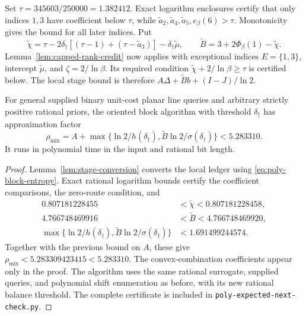 Set $\tau=345603/250000=1.382412$. Exact logarithm enclosures certify
that only indices $1,3$ have coefficient below $\tau$, while
$\widetilde a_2,\widetilde a_4,\widetilde a_5,e_\beta(6)>\tau$.
Monotonicity gives the bound for all later indices.
Put
\[
 \widetilde\chi=\tau-2\delta_\dagger
                [(\tau-1)+(\tau-\widetilde a_3)]
                -\delta_\dagger\widetilde\mu,\qquad
 \widetilde B=3+2\Phi_\beta(1)-\widetilde\chi.
\]
Lemma~\ref{lem:capped-rank-credit} now applies with exceptional
indices $E=\{1,3\}$, intercept $\widetilde\mu$, and
$\zeta=2/\ln\beta$. Its required condition
$\widetilde\chi+2/\ln\beta\ge\tau$ is certified below. The local
stage bound is therefore
$A\Delta+\widetilde B b+(I-J)/\ln2$.

\begin{theorem}
\label{thm:poly-mixed-expected}
For general supplied binary unit-cost planar line queries and arbitrary
strictly positive rational priors, the oriented block algorithm with
threshold $\delta_\dagger$ has approximation factor
\[
 \boxed{\rho_{\mathrm{mix}}=
 A+\max\{\ln2/h(\delta_\dagger),
         \widetilde B\ln2/\sigma(\delta_\dagger)\}<5.283310.}
\]
It runs in polynomial time in the input and rational bit length.
\end{theorem}
\begin{proof}
Lemma~\ref{lem:stage-conversion} converts the local ledger using
\eqref{eq:poly-block-entropy}. Exact rational logarithm
bounds certify the coefficient comparisons, the zero-route condition, and
\[
 \begin{aligned}
 0.807181228455&<\widetilde\chi<0.807181228458,\\
 4.766748469916&<\widetilde B<4.766748469920,\\
 \max\{\ln2/h(\delta_\dagger),
         \widetilde B\ln2/\sigma(\delta_\dagger)\}
 &<1.691499244574.
 \end{aligned}
\]
Together with the previous bound on $A$, these give
$\rho_{\mathrm{mix}}<5.283309423415<5.283310$.
The convex-combination coefficients appear only in the proof. The
algorithm uses the same rational surrogate, supplied queries, and
polynomial shift enumeration as before, with its new rational balance
threshold. The complete certificate is included in
\texttt{poly-expected-next-check.py}.
\end{proof}

